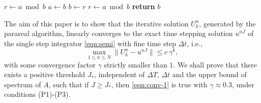 \begin{algorithm}
    \caption{Euclid’s algorithm}\label{euclid}
    \begin{algorithmic}[1]
        \State $r\gets a\bmod b$
            \State $a\gets b$
            \State $b\gets r$
            \State $r\gets a\bmod b$
        \EndWhile\label{euclidendwhile}
        \State \textbf{return} $b$
    \EndProcedure
    \end{algorithmic}
    \end{algorithm}

The aim of this paper is to show that the iterative solution $U_k^n$, generated by the parareal algorithm,
linearly converges to the exact time stepping solution $u^{nJ}$ of the single step integrator \eqref{eqn:semi} with fine time step $\Delta t$, i.e.,
\begin{equation}\label{eqn:conv-1}
\max_{1 \le n\le N}\|  U_{k}^n - u^{nJ}  \| \le  c \,\gamma^k,
\end{equation}
with some convergence factor $\gamma$ strictly smaller than $1$. We shall prove that
 there exists a positive threshold $J_*$,
independent of $\Delta T$, $\Delta t$ and the upper bound of spectrum of $A$, such that
if $J\ge J_*$, then \eqref{eqn:conv-1} is true with $\gamma \approx 0.3$,
under conditions (P1)-(P3).


